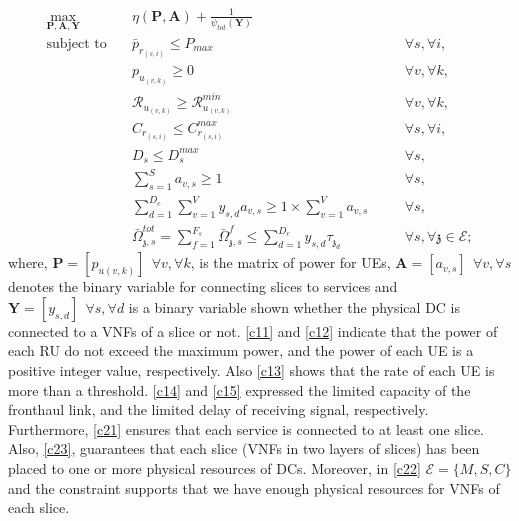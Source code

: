\documentclass[conference]{IEEEtran}
\begin{document}
\begin{subequations}
\begin{alignat}{4}
\max\limits_{\boldsymbol{P}, \boldsymbol{A}, \boldsymbol{Y} }   \quad &   \eta(\boldsymbol{P},\boldsymbol{A})+\frac{1}{\psi_{tot}(\boldsymbol{Y})} \\
\text{subject to} \quad  & \bar{p}_{r_{(s,i)}} \leq P_{max} && \quad \forall s, \forall i,
 \label{c11} \\
&p_{u_{(v,k)}}  \geq 0  &&\quad \forall v, \forall k,\label{c12} \\
&\mathcal{R}_{u_{(v,k)}} \geq  \mathcal{R}_{u_{(v,k)}}^{min} && \quad \forall v, \forall k,\label{c13} \\
&C_{r_{(s,i)}} \leq C_{r_{(s,i)}}^{max}  &&\quad \forall s, \forall i, \label{c14}\\
&D_{s} \leq D_{s}^{max}  &&\quad \forall s,\label{c15} \\
& \sum_{s=1}^{S}a_{v,s} \geq 1 &&\quad \forall s, \label{c21} \\
& \sum_{d=1}^{D_c}\sum_{v=1}^{V}y_{s,d}a_{v,s} \geq 1\times\sum_{v=1}^{V}a_{v,s} &&\quad \forall s,\label{c23} \\
 &\bar{\Omega}_{\mathfrak{z},s}^{tot} = \sum_{f=1}^{F_s}\bar{\Omega}_{\mathfrak{z},s}^f \leq  \sum_{d=1}^{D_c} y_{s,d} \tau_{\mathfrak{z}_d}
 && \quad  \forall s, \forall \mathfrak{z}\in \mathcal{E}; \label{c22}
\end{alignat}
\label{constraints}
\end{subequations}
where, $\boldsymbol{P} =[p_{u(v,k)}] \:\: \forall v , \forall k $, is the matrix of power for UEs, $\boldsymbol{A} =[a_{v,s}] \:\: \forall v , \forall s $ denotes the binary variable for connecting slices to services and $\boldsymbol{Y} =[y_{s,d}]  \:\: \forall s ,  \forall d $ is a binary variable shown whether
the physical DC is connected to a VNFs of a slice or not.
\eqref{c11} and \eqref{c12} indicate that the power of each RU do not exceed the maximum power, and the power of each UE is a positive integer value, respectively. Also \eqref{c13} shows that the rate of each UE is more than a threshold. \eqref{c14} and \eqref{c15} expressed the limited capacity of the fronthaul link, and the limited delay of receiving signal, respectively.
Furthermore, \eqref{c21}
ensures that each service is connected to at least one slice.
Also, \eqref{c23}, guarantees that each slice (VNFs in two layers of slices) has been placed to one or more physical resources of DCs. Moreover, in \eqref{c22}  $\mathcal{E} = \{M,S,C\}$ and the constraint supports
that we have enough physical resources for VNFs of each slice.\newline
\end{document}
